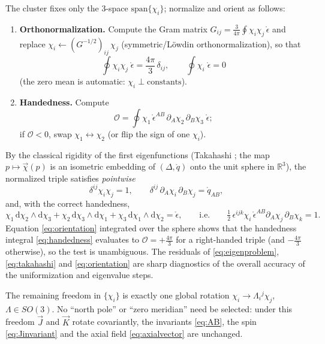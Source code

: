 \documentclass[11pt]{article}
\newcommand{\dd}{\mathrm{d}}
\newcommand{\qo}{\mathring{q}}          %
\newcommand{\epso}{\mathring{\epsilon}} %
\newcommand{\vJ}{\vec{J}}
\newcommand{\vK}{\vec{K}}
\begin{document}
The cluster fixes only the 3-space $\mathrm{span}\{\chi_i\}$; normalize and
orient as follows:
\begin{enumerate}
\item \textbf{Orthonormalization.}  Compute the Gram matrix
  $G_{ij} = \frac{3}{4\pi}\oint \chi_i\chi_j\,\epso$ and replace
  $\chi_i \leftarrow (G^{-1/2})_{ij}\,\chi_j$ (symmetric/L\"owdin
  orthonormalization), so that
  \begin{equation}
    \oint \chi_i \chi_j\;\epso = \frac{4\pi}{3}\,\delta_{ij},
    \qquad
    \oint \chi_i\;\epso = 0
    \label{eq:chinorm}
  \end{equation}
  (the zero mean is automatic: $\chi_i \perp \text{constants}$).
\item \textbf{Handedness.}  Compute
  \begin{equation}
    \mathcal{O} = \oint \chi_1\,
      \epso^{AB}\,\partial_A\chi_2\,\partial_B\chi_3\;\epso ;
    \label{eq:handedness}
  \end{equation}
  if $\mathcal{O}<0$, swap $\chi_1\leftrightarrow\chi_2$ (or flip the sign
  of one $\chi_i$).
\end{enumerate}
By the classical rigidity of the first eigenfunctions (Takahashi
\cite{takahashi1966}; the map $p\mapsto\vec\chi(p)$ is an isometric embedding
of $(\Delta,\qo)$ onto the unit sphere in $\mathbb{R}^3$), the normalized
triple satisfies \emph{pointwise}
\begin{equation}
  \delta^{ij}\chi_i\chi_j = 1,
  \qquad
  \delta^{ij}\,\partial_A\chi_i\,\partial_B\chi_j = \qo_{AB},
  \label{eq:takahashi}
\end{equation}
and, with the correct handedness,
\begin{equation}
  \chi_1\,\dd\chi_2\wedge\dd\chi_3
  + \chi_2\,\dd\chi_3\wedge\dd\chi_1
  + \chi_3\,\dd\chi_1\wedge\dd\chi_2 = \epso,
  \qquad\text{i.e.}\qquad
  \tfrac12\,\epsilon^{ijk}\chi_i\,
  \epso^{AB}\partial_A\chi_j\,\partial_B\chi_k = 1 .
  \label{eq:orientation}
\end{equation}
Equation \eqref{eq:orientation} integrated over the sphere shows that the
handedness integral \eqref{eq:handedness} evaluates to
$\mathcal{O} = +\frac{4\pi}{3}$ for a right-handed triple (and
$-\frac{4\pi}{3}$ otherwise), so the test is unambiguous.  The residuals of \eqref{eq:eigenproblem},
\eqref{eq:takahashi} and \eqref{eq:orientation} are sharp diagnostics of the
overall accuracy of the uniformization and eigenvalue steps.

The remaining freedom in $\{\chi_i\}$ is exactly one global rotation
$\chi_i \to \Lambda_i{}^j \chi_j$, $\Lambda\in SO(3)$.  No ``north pole'' or
``zero meridian'' need be selected: under this freedom $\vJ$ and $\vK$ rotate
covariantly, the invariants \eqref{eq:AB}, the spin \eqref{eq:Jinvariant} and
the axial field \eqref{eq:axialvector} are unchanged.
\end{document}
